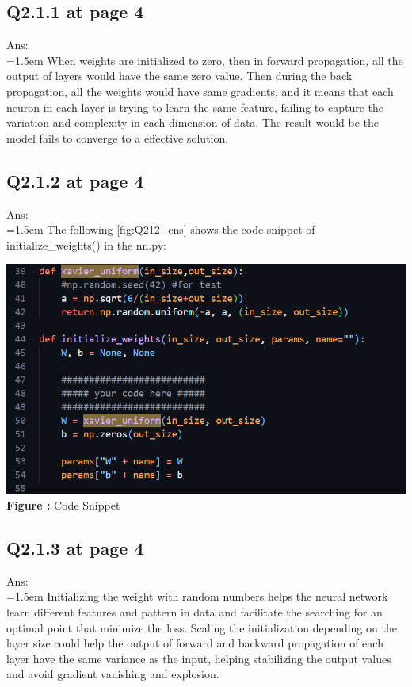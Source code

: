 \documentclass{article}
\begin{document}
	\newpage
	\subsection*{Q2.1.1 at page 4}
	Ans:\\
	\hangindent=1.5em \hspace{1.5em} When weights are initialized to zero, then in forward propagation, all the output of layers would have the same zero value. Then during the back propagation, all the weights would have same gradients, and it means that each neuron in each layer is trying to learn the same feature, failing to capture the variation and complexity in each dimension of data. The result would be the model fails to converge to a effective solution.

	\newpage
	\subsection*{Q2.1.2 at page 4}
	Ans:\\
	\hangindent=1.5em \hspace{1.5em} The following \autoref{fig:Q212_cns} shows the code snippet of initialize\_weights() in the nn.py:
	\newline

	\begin{minipage}{1\linewidth}
		\centering
		\hspace{0.12\linewidth} 
		\includegraphics[width=0.7\linewidth]{./Q2_1_2_cns.png}  %
		\newline
		\textbf{Figure \thefigure:} Code Snippet %
		\label{fig:Q212_cns}  %
	\end{minipage}
	
	\newpage
	\subsection*{Q2.1.3 at page 4}
	Ans:\\
	\hangindent=1.5em \hspace{1.5em} Initializing the weight with random numbers helps the neural network learn different features and pattern in data and facilitate the searching for an optimal point that minimize the loss. Scaling the initialization depending on the layer size could help the output of forward and backward propagation of each layer have the same variance as the input, helping stabilizing the output values and avoid gradient vanishing and explosion.	
	
\end{document}

